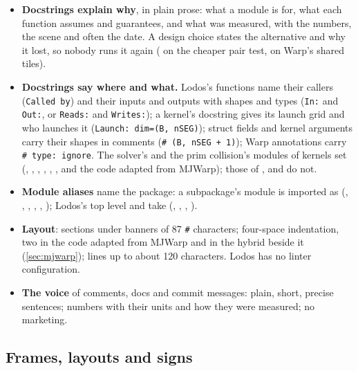 \begin{itemize}
\item \textbf{Docstrings explain why}, in plain prose: what a module is for, what each function assumes and guarantees, and what was measured, with the numbers, the scene and often the date. A design choice states the alternative and why it lost, so nobody runs it again ( on the cheaper pair test,  on Warp's shared tiles).
\item \textbf{Docstrings say where and what.} Lodos's functions name their callers (\texttt{Called by}) and their inputs and outputs with shapes and types (\texttt{In:} and \texttt{Out:}, or \texttt{Reads:} and \texttt{Writes:}); a kernel's docstring gives its launch grid and who launches it (\texttt{Launch: dim=(B, nSEG)}); struct fields and kernel arguments carry their shapes in comments (\texttt{\# (B, nSEG + 1)}); Warp annotations carry \texttt{\# type: ignore}. The solver's and the prim collision's modules of kernels set  (, , , , , , and the code adapted from MJWarp); those of ,  and  do not.
\item \textbf{Module aliases} name the package: a subpackage's module is imported as  (, , , , , ); Lodos's top level and  take  (, , , ).
\item \textbf{Layout}: sections under banners of 87 \texttt{\#} characters; four-space indentation, two in the code adapted from MJWarp and in the hybrid beside it (\cref{sec:mjwarp}); lines up to about 120 characters. Lodos has no linter configuration.
\item \textbf{The voice} of comments, docs and commit messages: plain, short, precise sentences; numbers with their units and how they were measured; no marketing.
\end{itemize}

\subsection{Frames, layouts and signs}\label{sec:layouts}

